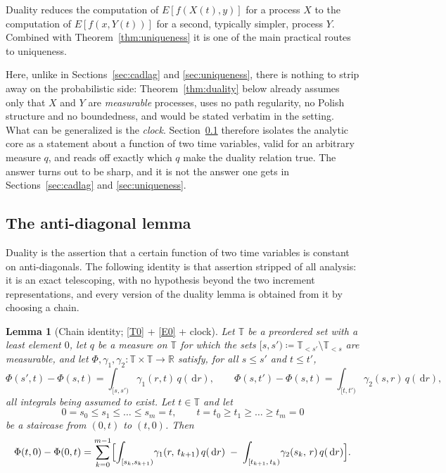 \documentclass[11pt,a4paper]{article}
\theoremstyle{plain}
\newtheorem{lemma}[theorem]{Lemma}
\theoremstyle{definition}
\theoremstyle{remark}
\newcommand{\R}{\mathbb{R}}
\newcommand{\T}{\mathbb{T}}                     %
\newcommand{\dif}{\,\mathrm{d}}
\newcommand{\CPS}{\cite{CPS23}}
\begin{document}
Duality reduces the computation of $E[f(X(t),y)]$ for a process $X$ to the
computation of $E[f(x,Y(t))]$ for a second, typically simpler, process $Y$.
Combined with Theorem~\ref{thm:uniqueness} it is one of the main practical
routes to uniqueness.

Here, unlike in Sections~\ref{sec:cadlag} and \ref{sec:uniqueness}, there is
nothing to strip away on the probabilistic side: Theorem~\ref{thm:duality} below
already assumes only that $X$ and $Y$ are \emph{measurable} processes, uses no
path regularity, no Polish structure and no boundedness, and would be stated
verbatim in the \CPS{} setting.  What can be generalized is the \emph{clock}.
Section~\ref{ssec:antidiag} therefore isolates the analytic core as a statement
about a function of two time variables, valid for an arbitrary measure
$q$, and reads off exactly which $q$ make the duality relation true.  The answer
turns out to be sharp, and it is not the answer one gets in
Sections~\ref{sec:cadlag} and \ref{sec:uniqueness}.

\subsection{The anti-diagonal lemma}
\label{ssec:antidiag}

Duality is the assertion that a certain function of two time variables is
constant on anti-diagonals.  The following identity is that assertion stripped of
all analysis: it is an exact telescoping, with no hypothesis beyond the two
increment representations, and every version of the duality lemma is obtained
from it by choosing a chain.

\begin{lemma}[Chain identity; \eqref{T0} + \eqref{E0} + clock]
  \label{lem:chain}
  Let $\T$ be a preordered set with a least element $0$, let $q$ be a measure on
  $\T$ for which the sets $[s,s') \coloneqq \T_{<s'} \setminus \T_{<s}$ are
  measurable, and let $\Phi, \gamma_1, \gamma_2 : \T \times \T \to \R$ satisfy,
  for all $s \leq s'$ and $t \leq t'$,
  \begin{equation}
    \label{eq:incrementrep}
    \Phi(s',t) - \Phi(s,t) = \int_{[s,s')} \gamma_1(r,t) \, q(\dif r),
    \qquad
    \Phi(s,t') - \Phi(s,t) = \int_{[t,t')} \gamma_2(s,r) \, q(\dif r),
  \end{equation}
  all integrals being assumed to exist.  Let $t \in \T$ and let
  \[
    0 = s_0 \leq s_1 \leq \dots \leq s_m = t ,
    \qquad
    t = t_0 \geq t_1 \geq \dots \geq t_m = 0
  \]
  be a \emph{staircase} from $(0,t)$ to $(t,0)$.  Then
  \begin{equation}
    \label{eq:chain}
    \Phi(t,0) - \Phi(0,t)
      = \sum_{k=0}^{m-1} \Bigl[
          \int_{[s_k,s_{k+1})} \! \gamma_1(r,\, t_{k+1}) \, q(\dif r)
          \;-\;
          \int_{[t_{k+1},\, t_k)} \! \gamma_2(s_k,\, r) \, q(\dif r)
        \Bigr] .
  \end{equation}
\end{lemma}
\end{document}

